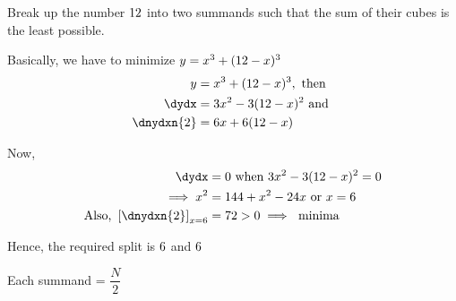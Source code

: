


\question[2] Break up the number $12$ into two summands such that the sum of their cubes
is the least possible.

\watchout 

\begin{solution}[\halfpage]
   Basically, we have to minimize $y = x^3 + (12-x)^3$
   \begin{align}
      y &= x^3 + (\va -x)^3, \text{ then } \\
      \dydx &= 3x^2 - 3(\va - x)^2 \text{ and } \\
      \dnydxn{2} &= 6x + 6(\va-x)
   \end{align}
   
   Now, 
   \begin{align}
      \dydx &= 0 \text { when } 3x^2 - 3(\va - x)^2 = 0 \\
      \implies x^2 &= \vd + x^2 - \vc x \text{ or } x = \vb \\
      \text{Also, }\left[\dnydxn{2}\right]_{x=\vb} &= \ve > 0 \implies \text{ minima }
   \end{align}
   
   Hence, the required split is $6$ and $6$
\end{solution}
\ifprintanswers\begin{codex}Each summand = $\dfrac{N}{2}$\end{codex}\fi
